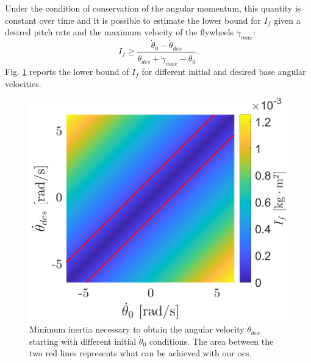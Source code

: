 \documentclass[letterpaper, 10 pt, conference]{ieeeconf}  %
\begin{document}
Under the condition of conservation of the angular momentum, this quantity is constant over time and it is possible to estimate the lower bound for $I_{f}$ given a desired pitch rate and the maximum velocity of the flywheels $\dot{\gamma}_{max}$:
\begin{equation}
I_{f} \geq \dfrac{\dot{\theta}_0-\dot{\theta}_{des}}{\dot{\theta}_{des}+\dot{\gamma}_{max}-\dot{\theta}_0}.
\end{equation}
Fig. \ref{fig:inertia_limits} reports the lower bound of $I_{f}$ for different initial and desired base angular velocities.
\begin{figure}
	\centering
	\includegraphics[width=.7\linewidth]{figures/inertia_limits.eps}
	\caption{\small Minimum inertia necessary to obtain the angular velocity $\dot{\theta}_{des}$ starting with different initial $\dot{\theta}_0$ conditions. The area between the two red lines represents what can be achieved with our \gls{ocs}.}
	\label{fig:inertia_limits}
\end{figure}
\end{document}
